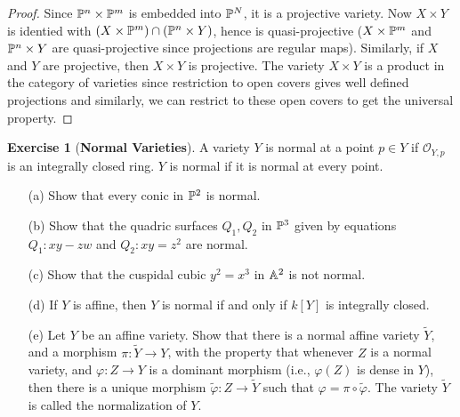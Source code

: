 \documentclass[11pt]{book}
\theoremstyle{definition}
\newtheorem{exercise}{Exercise}[section]
\begin{document}
\begin{proof}
Since $\P^n\times\P^m$ is embedded into $\P^N$, it is a projective variety. Now $X\times Y$ is identied with $(X\times\P^m)\cap(\P^n\times Y)$, hence is quasi-projective ($X\times\P^m$ and $\P^n\times Y$ are quasi-projective since projections are regular maps). Similarly, if $X$ and $Y$ are projective, then $X\times Y$ is projective. The variety $X\times Y$ is a product in the category of varieties since restriction to open covers gives well defined projections and similarly, we can restrict to these open covers to get the universal property.
\end{proof}
\begin{exercise}[\textbf{Normal Varieties}]
A variety $Y$ is normal at a point $p\in Y$ if $\mathcal{O}_{Y,p}$ is an integrally closed ring. $Y$ is normal if it is normal at every point.
\begin{itemize}
\item[(a)] Show that every conic in $\P^2$ is normal.
\item[(b)] Show that the quadric surfaces $Q_1,Q_2$ in $\P^3$ given by equations $Q_1:xy-zw$ and $Q_2:xy=z^2$ are normal.
\item[(c)] Show that the cuspidal cubic $y^2=x^3$ in $\A^2$ is not normal.
\item[(d)] If $Y$ is affine, then $Y$ is normal if and only if $k[Y]$ is integrally closed. 
\item[(e)] Let $Y$ be an affine variety. Show that there is a normal affine variety $\tilde{Y}$, and a morphism $\pi:\tilde{Y}\to Y$, with the property that whenever $Z$ is a normal variety, and $\varphi:Z\to Y$ is a dominant morphism (i.e., $\varphi(Z)$ is dense in $Y$), then there is a unique morphism $\tilde{\varphi}:Z\to\tilde{Y}$ such that $\varphi=\pi\circ\tilde{\varphi}$. The variety $\tilde{Y}$ is called the normalization of $Y$.
\end{itemize}
\end{exercise}
\end{document}
